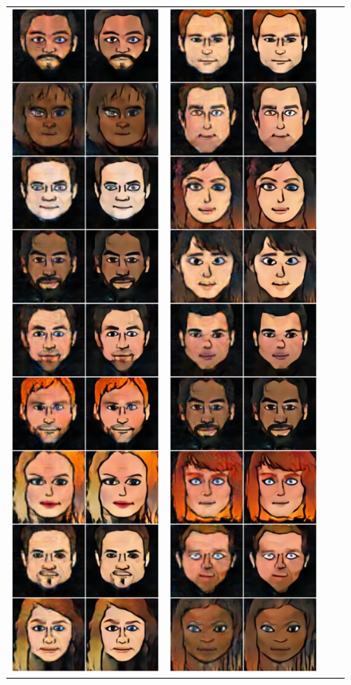 \documentclass{article} %
\begin{document}
\begin{figure}[H]
\centering
\begin{tabular}{cccc}
\includegraphics[trim=0 0 0 0, clip, width=0.230235\linewidth]{super_res_part1.png}&
\includegraphics[trim=0 0 0 0, clip, width=0.230235\linewidth]{super_res_part2.png}&

\end{tabular}
\end{figure}
\end{document}
